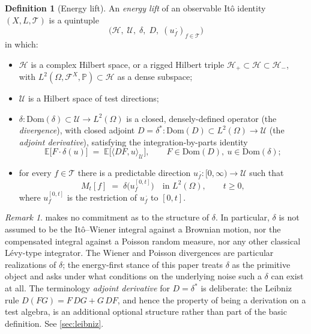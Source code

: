 \documentclass[11pt,reqno]{amsart}
\theoremstyle{plain}
\theoremstyle{definition}
\newtheorem{definition}[theorem]{Definition}
\theoremstyle{remark}
\newtheorem{remark}[theorem]{Remark}
\newcommand{\E}{\mathbb{E}}
\newcommand{\Prob}{\mathbb{P}}
\newcommand{\Dom}{\mathrm{Dom}}
\begin{document}
\begin{definition}[Energy lift]\label{def:energy-lift}
An \emph{energy lift} of an observable It\^o identity
$(X,L,\mathcal T)$ is a quintuple
\[
  \bigl(\mathcal H,\;\mathcal U,\;\delta,\;D,\;(u^{\,\cdot}_f)_{f\in\mathcal T}\bigr)
\]
in which:
\begin{itemize}
\item[$(\mathrm i)$] $\mathcal H$ is a complex Hilbert space, or a
rigged Hilbert triple $\mathcal H_+\subset\mathcal H\subset\mathcal H_-$,
with $L^2(\Omega,\mathcal F^X,\Prob)\subset\mathcal H$ as a dense
subspace;
\item[$(\mathrm{ii})$] $\mathcal U$ is a Hilbert space of test directions;
\item[$(\mathrm{iii})$] $\delta\colon\Dom(\delta)\subset\mathcal U\to L^2(\Omega)$
is a closed, densely-defined operator (the \emph{divergence}), with
closed adjoint $D=\delta^{*}\colon\Dom(D)\subset L^2(\Omega)\to\mathcal U$
(the \emph{adjoint derivative}), satisfying the integration-by-parts
identity
\begin{equation}\label{eq:IBP}
  \E\!\bigl[F\cdot\delta(u)\bigr]
  \;=\;\E\!\bigl[\langle DF,u\rangle_{\mathcal U}\bigr],
  \qquad F\in\Dom(D),\ u\in\Dom(\delta);
\end{equation}
\item[$(\mathrm{iv})$] for every $f\in\mathcal T$ there is a
predictable direction
$u^{\,\cdot}_f\colon[0,\infty)\to\mathcal U$ such that
\begin{equation}\label{eq:M-as-delta}
  M_t[f]\;=\;\delta\!\bigl(u_f^{[0,t]}\bigr)\quad\text{in }L^2(\Omega),
  \qquad t\ge 0,
\end{equation}
where $u_f^{[0,t]}$ is the restriction of $u_f^{\,\cdot}$ to $[0,t]$.
\end{itemize}
\end{definition}

\begin{remark}\label{rem:energy-lift-no-classical}
 makes no commitment as to the structure of
$\delta$. In particular, $\delta$ is not assumed to be the
It\^o--Wiener integral against a Brownian motion, nor the
compensated integral against a Poisson random measure, nor any other
classical L\'evy-type integrator. The Wiener and Poisson divergences
are particular realizations of $\delta$; the energy-first stance of
this paper treats $\delta$ as the primitive object and asks under
what conditions on the underlying noise such a $\delta$ can exist
at all. The terminology \emph{adjoint derivative} for $D=\delta^{*}$
is deliberate: the Leibniz rule $D(FG)=F\,DG+G\,DF$, and hence the
property of being a derivation on a test algebra, is an additional
optional structure rather than part of the basic definition. See
\cref{sec:leibniz}.
\end{remark}
\end{document}
